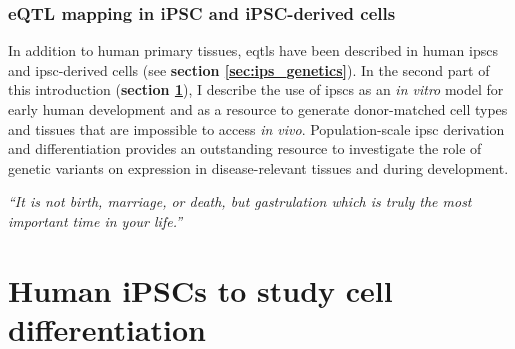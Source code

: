 

\subsubsection{eQTL mapping in iPSC and iPSC-derived cells}

In addition to human primary tissues, \glspl{eqtl} have been described in human \glspl{ipsc} and \gls{ipsc}-derived cells (see \textbf{section \ref{sec:ips_genetics}}).
In the second part of this introduction (\textbf{section \ref{sec:human_ipscs}}), I describe the use of \glspl{ipsc} as an \textit{in vitro} model for early human development and as a resource to generate donor-matched cell types and tissues that are impossible to access \textit{in vivo}.
Population-scale \gls{ipsc} derivation and differentiation provides an outstanding resource to investigate the role of genetic variants on expression in disease-relevant tissues and during development.



\newpage

\vspace*{10px}

\textit{“It is not birth, marriage, or death, but gastrulation which is truly the most important time in your life.”}\\

\vspace*{5px}


\section{Human iPSCs to study cell differentiation}  %
\label{sec:human_ipscs}  

